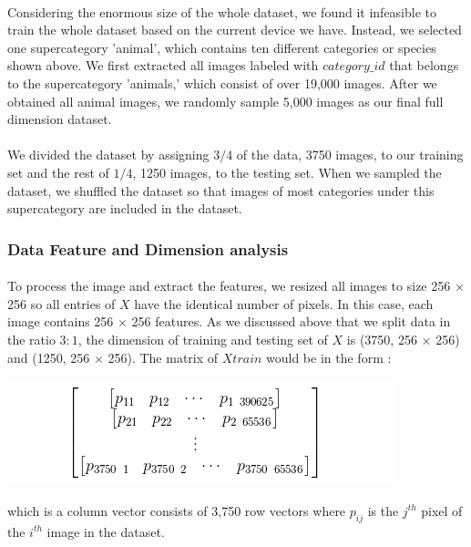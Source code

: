 \documentclass{article}
\begin{document}
\paragraph{}
Considering the enormous size of the whole dataset, we found it infeasible to train the whole dataset based on the current device we have. Instead, we selected one supercategory 'animal', which contains ten different categories or species shown above. We first extracted all images labeled with $category\_ id$ that belongs to the supercategory 'animals,' which consist of over 19,000 images. After we obtained all animal images, we randomly sample 5,000 images as our final full dimension dataset.
\paragraph{}
We divided the dataset by assigning $3 \slash 4$ of the data, 3750 images, to our training set and the rest of $1\slash 4$, 1250 images, to the testing set. When we sampled the dataset, we shuffled the dataset so that images of most categories under this supercategory are included in the dataset.
 
\subsubsection{Data Feature and Dimension analysis}
\paragraph{}
To process the image and extract the features, we resized all images to size 256 $\times$ 256 so all entries of $X$ have the identical number of pixels. In this case, each image contains 256 $\times$ 256 features. As we discussed above that we split data in the ratio $3:1$, the dimension of training and testing set of $X$ is (3750, 256 $\times$ 256) and (1250, 256 $\times$ 256). The matrix of $X{train}$  would be in the form :
\begin{center}
\includegraphics[scale=0.57]{6}
\end{center}
which is a column vector consists of 3,750 row vectors  where $p_{ij}$ is the $j^{th}$ pixel of the $i^{th}$ image in the dataset.
\end{document}

